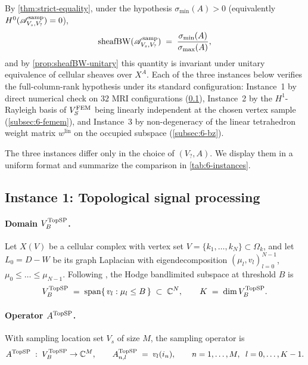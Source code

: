 By \cref{thm:strict-equality}, under the hypothesis
$\sigma_{\min}(A) > 0$ (equivalently $H^0(\mathscr{A}^{\mathrm{samp}}_{V_s, V_?}) = 0$),
\begin{equation}\label{eq:6-strict}
  \operatorname{sheafBW}(\mathscr{A}^{\mathrm{samp}}_{V_s, V_?})
  \;=\;
  \frac{\sigma_{\min}(A)}{\sigma_{\max}(A)},
\end{equation}
and by \cref{prop:sheafBW-unitary} this quantity is invariant under
unitary equivalence of cellular sheaves over $X^A$. Each of the three
instances below verifies the full-column-rank hypothesis under its
standard configuration: Instance~1 by direct numerical check on
$32$ MRI configurations (\cref{subsec:6-topsp}), Instance~2 by the
$H^1$-Rayleigh basis of $V_S^{\mathrm{FEM}}$ being linearly independent at
the chosen vertex sample (\cref{subsec:6-femem}), and Instance~3 by
non-degeneracy of the linear tetrahedron weight matrix
$w^{\mathrm{lin}}$ on the occupied subspace
(\cref{subsec:6-bz}).

The three instances differ only in the choice of $(V_?, A)$. We display
them in a uniform format and summarize the comparison in
\cref{tab:6-instances}.

\subsection{Instance 1: Topological signal processing}\label{subsec:6-topsp}

\paragraph{Domain $V_B^{\mathrm{TopSP}}$.}
Let $X(V)$ be a cellular complex with vertex set
$V = \{k_1, \dots, k_N\} \subset \Omega_k$, and let $L_0 = D - W$ be its
graph Laplacian with eigendecomposition
$(\mu_l, v_l)_{l=0}^{N-1}$, $\mu_0 \le \dots \le \mu_{N-1}$. Following
\cite[\S 4.4]{BarbarossaSardellitti2020}, the Hodge bandlimited
subspace at threshold $B$ is
\[
  V_B^{\mathrm{TopSP}}
  \;=\;
  \operatorname{span}\{\, v_l : \mu_l \le B \,\}
  \;\subset\; \mathbb{C}^N,
  \qquad
  K \;=\; \dim V_B^{\mathrm{TopSP}}.
\]

\paragraph{Operator $A^{\mathrm{TopSP}}$.}
With sampling location set $V_s$ of size $M$, the sampling operator is
\[
  A^{\mathrm{TopSP}}
  \;:\;
  V_B^{\mathrm{TopSP}} \to \mathbb{C}^M,
  \qquad
  A^{\mathrm{TopSP}}_{n,l}
  \;=\;
  v_l(i_n),
  \qquad n = 1, \dots, M,\;\; l = 0, \dots, K-1.
\]


